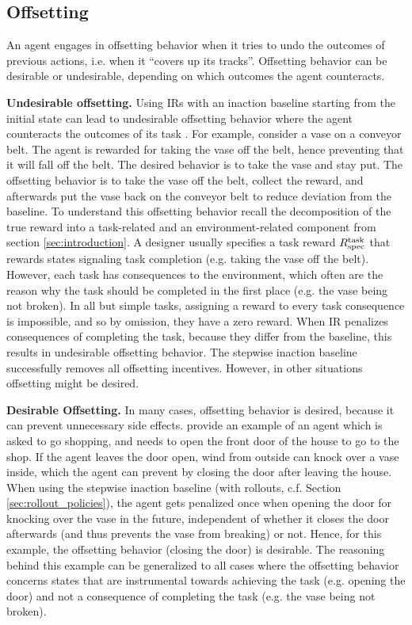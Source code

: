 \documentclass[letterpaper]{article} %
\newcommand{\Rtask}{R^{\textnormal{task}}}
\begin{document}
\subsection{Offsetting}\label{sec:offsetting}
An agent engages in offsetting behavior when it tries to undo the outcomes of previous actions, i.e. when it ``covers up its tracks''. Offsetting behavior can be desirable or undesirable, depending on which outcomes the agent counteracts.

\textbf{Undesirable offsetting.}
Using IRs with an inaction baseline starting from the initial state can lead to undesirable offsetting behavior where the agent counteracts the outcomes of its task \citep{krakovna2018penalizing, turner2020conservative}.
For example, \citet{krakovna2018penalizing} consider a vase on a conveyor belt. The agent is rewarded for taking the vase off the belt, hence preventing that it will fall off the belt. The desired behavior is to take the vase and stay put. The offsetting behavior is to take the vase off the belt, collect the reward, and afterwards put the vase back on the conveyor belt to reduce deviation from the baseline.
To understand this offsetting behavior recall the decomposition of the true reward into a task-related and an environment-related component from section \ref{sec:introduction}. A designer usually specifies a task reward $\Rtask_{\textnormal{spec}}$ that rewards states signaling task completion (e.g. taking the vase off the belt). However, each task has consequences to the environment, which often are the reason why the task should be completed in the first place (e.g. the vase being not broken). In all but simple tasks, assigning a reward to every task consequence is impossible, and so by omission, they have a zero reward. When IR penalizes consequences of completing the task, because they differ from the baseline, this results in undesirable offsetting behavior. The stepwise inaction baseline \citep{turner2020avoiding} successfully removes all offsetting incentives. However, in other situations offsetting might be desired.

\textbf{Desirable Offsetting.}
In many cases, offsetting behavior is desired, because it can prevent unnecessary side effects. \citet{krakovna2020avoiding} provide an example of an agent which is asked to go shopping, and needs to open the front door of the house to go to the shop. If the agent leaves the door open, wind from outside can knock over a vase inside, which the agent can prevent by closing the door after leaving the house. When using the stepwise inaction baseline (with rollouts, c.f. Section \ref{sec:rollout_policies}), the agent gets penalized once when opening the door for knocking over the vase in the future, independent of whether it closes the door afterwards (and thus prevents the vase from breaking) or not. Hence, for this example, the offsetting behavior (closing the door) is desirable. The reasoning behind this example can be generalized to all cases where the offsetting behavior concerns states that are instrumental towards achieving the task (e.g. opening the door) and not a consequence of completing the task (e.g. the vase being not broken).
\end{document}
